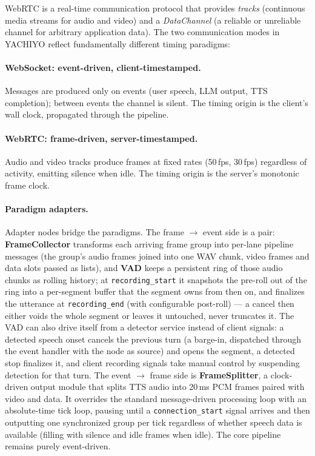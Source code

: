 \documentclass[11pt,a4paper]{article}
\begin{document}
WebRTC is a real-time communication protocol that provides \emph{tracks} (continuous media streams for audio and video) and a \emph{DataChannel} (a reliable or unreliable channel for arbitrary application data). The two communication modes in YACHIYO reflect fundamentally different timing paradigms:

\paragraph{WebSocket: event-driven, client-timestamped.}
Messages are produced only on events (user speech, LLM output, TTS completion); between events the channel is silent. The timing origin is the client's wall clock, propagated through the pipeline.

\paragraph{WebRTC: frame-driven, server-timestamped.}
Audio and video tracks produce frames at fixed rates (50\,fps, 30\,fps) regardless of activity, emitting silence when idle. The timing origin is the server's monotonic frame clock.

\paragraph{Paradigm adapters.}
Adapter nodes bridge the paradigms. The frame $\rightarrow$ event side is a pair: \textbf{FrameCollector} transforms each arriving frame group into per-lane pipeline messages (the group's audio frames joined into one WAV chunk, video frames and data slots passed as lists), and \textbf{VAD} keeps a persistent ring of those audio chunks as rolling history; at \texttt{recording\_start} it snapshots the pre-roll out of the ring into a per-segment buffer that the segment owns from then on, and finalizes the utterance at \texttt{recording\_end} (with configurable post-roll) --- a cancel then either voids the whole segment or leaves it untouched, never truncates it. The VAD can also drive itself from a detector service instead of client signals: a detected speech onset cancels the previous turn (a barge-in, dispatched through the event handler with the node as source) and opens the segment, a detected stop finalizes it, and client recording signals take manual control by suspending detection for that turn. The event $\rightarrow$ frame side is \textbf{FrameSplitter}, a clock-driven output module that splits TTS audio into 20\,ms PCM frames paired with video and data. It overrides the standard message-driven processing loop with an absolute-time tick loop, pausing until a \texttt{connection\_start} signal arrives and then outputting one synchronized group per tick regardless of whether speech data is available (filling with silence and idle frames when idle). The core pipeline remains purely event-driven.
\end{document}
